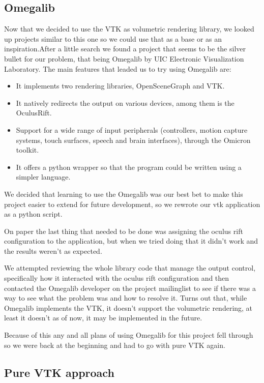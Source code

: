 \documentclass[11pt]{article} %
\begin{document}
\subsection{Omegalib}
Now that we decided to use the VTK as volumetric rendering library, we looked up projects similar to this one so we could use that as a base or as an inspiration.After a little search we found a project that seems to be the silver bullet for our problem, that being Omegalib by UIC Electronic Visualization Laboratory.
\newline
\newline
The main features that leaded us to try using Omegalib are:
\begin{itemize}
\item It implements two rendering libraries, OpenSceneGraph and VTK.
\item It natively redirects  the output on various devices, among them is the OculusRift.
\item Support for a wide range of input peripherals (controllers, motion  capture systems, touch surfaces, speech and brain interfaces), through  the  Omicron toolkit.
\item It offers a python wrapper so that the program could be written using a simpler language.
\end{itemize}

\noindent
We decided that learning to use the Omegalib was our best bet to make this project easier to extend for future development, so we rewrote our vtk application as a python script.

On paper the last thing that needed to be done was assigning the oculus rift configuration to the application, but when we tried doing that it didn't work and the results weren't as expected.

We attempted  reviewing the whole library code that manage the output control, specifically how it interacted with the oculus rift configuration and then contacted the Omegalib developer on the project mailinglist to see if there was a way to see what the problem was and how to resolve it.
Turns out that, while Omegalib implements the VTK, it doesn't support the volumetric rendering, at least it doesn't as of now, it may be implemented in the future.

Because of this any and all plans of using Omegalib for this project fell through so we were back at the beginning and had to go with pure VTK again.

\subsection{Pure VTK approach}
\end{document}
